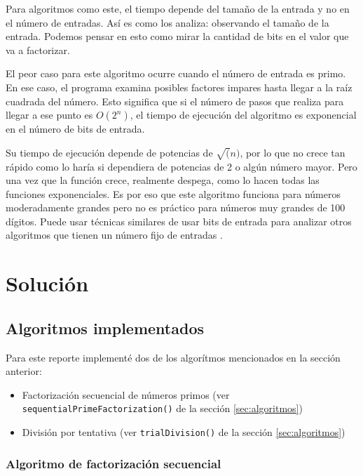 \documentclass{article}
\begin{document}
Para algoritmos como este, el tiempo depende del tamaño de la entrada y no en el
número de entradas. Así es como los analiza: observando el tamaño de la entrada.
Podemos pensar en esto como mirar la cantidad de bits en el valor que va a
factorizar.

El peor caso para este algoritmo ocurre cuando el número de entrada es primo. En
ese caso, el programa examina posibles factores impares hasta llegar a la raíz
cuadrada del número. Esto significa que si el número de pasos que realiza para
llegar a ese punto es $ O(2^n)$, el tiempo de ejecución del algoritmo es
exponencial en el número de bits de entrada.

Su tiempo de ejecución depende de potencias de $\sqrt(n)$, por lo que no crece
tan rápido como lo haría si dependiera de potencias de 2 o algún número mayor.
Pero una vez que la función crece, realmente despega, como lo hacen todas las
funciones exponenciales. Es por eso que este algoritmo funciona para números
moderadamente grandes pero no es práctico para números muy grandes de 100
dígitos. Puede usar técnicas similares de usar bits de entrada para analizar
otros algoritmos que tienen un número fijo de entradas
\cite{stephens2015learning}.


\section{Solución}

\subsection{Algoritmos implementados}

Para este reporte implementé dos de los algorítmos mencionados en la sección
anterior:

\begin{itemize}
\item Factorización secuencial de números primos (ver
\texttt{sequentialPrimeFactorization()} de la sección \ref{sec:algoritmos})
    \item División por tentativa (ver
    \texttt{trialDivision()} de la sección \ref{sec:algoritmos})
\end{itemize}

\subsubsection{Algoritmo de factorización secuencial}
\end{document}
